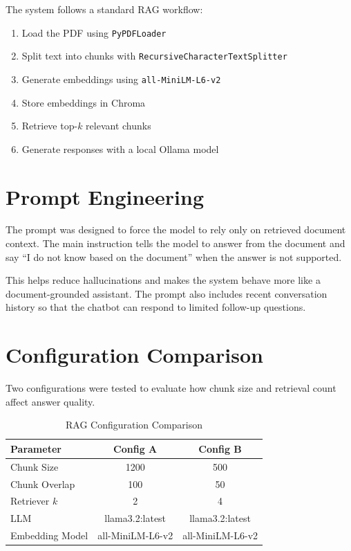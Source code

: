 \documentclass[11pt]{article}
\begin{document}
	The system follows a standard RAG workflow:
	
	\begin{enumerate}
		\item Load the PDF using \texttt{PyPDFLoader}
		\item Split text into chunks with \texttt{RecursiveCharacterTextSplitter}
		\item Generate embeddings using \texttt{all-MiniLM-L6-v2}
		\item Store embeddings in Chroma
		\item Retrieve top-$k$ relevant chunks
		\item Generate responses with a local Ollama model
	\end{enumerate}
	
	\section{Prompt Engineering}
	
	The prompt was designed to force the model to rely only on retrieved document context. The main instruction tells the model to answer from the document and say ``I do not know based on the document'' when the answer is not supported.
	
	This helps reduce hallucinations and makes the system behave more like a document-grounded assistant. The prompt also includes recent conversation history so that the chatbot can respond to limited follow-up questions.
	
	\section{Configuration Comparison}
	
	Two configurations were tested to evaluate how chunk size and retrieval count affect answer quality.
	
	\begin{table}[H]
		\centering
		\caption{RAG Configuration Comparison}
		\begin{tabular}{lcc}
			\toprule
			\textbf{Parameter} & \textbf{Config A} & \textbf{Config B} \\
			\midrule
			Chunk Size & 1200 & 500 \\
			Chunk Overlap & 100 & 50 \\
			Retriever $k$ & 2 & 4 \\
			LLM & llama3.2:latest & llama3.2:latest \\
			Embedding Model & all-MiniLM-L6-v2 & all-MiniLM-L6-v2 \\
			\bottomrule
		\end{tabular}
	\end{table}
	
\end{document}
